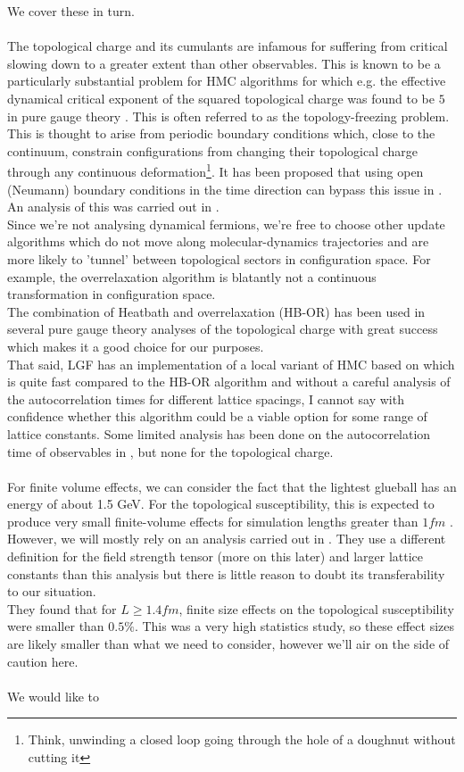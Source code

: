 \documentclass[a4paper,10pt]{book}
\begin{document}
We cover these in turn.\\\\The topological charge and its cumulants are infamous for suffering from critical slowing down to a greater extent than other observables. This is known to be a particularly substantial problem for HMC algorithms for which e.g. the effective dynamical critical exponent of the squared topological charge was found to be $5$ in pure gauge theory \cite{2011}. This is often referred to as the topology-freezing problem. This is thought to arise from periodic boundary conditions which, close to the continuum, constrain configurations from changing their topological charge through any continuous deformation\footnote{Think, unwinding a closed loop going through the hole of a doughnut without cutting it}. It has been proposed that using open (Neumann) boundary conditions in the time direction can bypass this issue in \cite{Lusch_top_bar}. An analysis of this was carried out in \cite{PhysRevD.90.074502}.\\Since we're not analysing dynamical fermions, we're free to choose other update algorithms which do not move along molecular-dynamics trajectories and are more likely to 'tunnel' between topological sectors in configuration space. For example, the overrelaxation algorithm is blatantly not a continuous transformation in configuration space.\\The combination of Heatbath and overrelaxation (HB-OR) has been used in several pure gauge theory analyses of the topological charge \cite{non_gaussianities2015} \cite{PhysRevD.92.094518} with great success which makes it a good choice for our purposes.\\That said, LGF has an implementation of a local variant of HMC based on \cite{Kennedy_1994} which is quite fast compared to the HB-OR algorithm and without a careful analysis of the autocorrelation times for different lattice spacings, I cannot say with confidence whether this algorithm could be a viable option for some range of lattice constants. Some limited analysis has been done on the autocorrelation time of observables in \cite{LHMC_autocorr}, but none for the topological charge.\\\\For finite volume effects, we can consider the fact that the lightest glueball has an energy of about 1.5 GeV. For the topological susceptibility, this is expected to produce very small finite-volume effects for simulation lengths greater than $1fm$ \cite{Del_Debbio_2005}. However, we will mostly rely on an analysis carried out in \cite{non_gaussianities2015}. They use a different definition for the field strength tensor (more on this later) and larger lattice constants than this analysis but there is little reason to doubt its transferability to our situation.\\They found that for $L\geq 1.4fm$, finite size effects on the topological susceptibility were smaller than  $0.5\%$. This was a very high statistics study, so these effect sizes are likely smaller than what we need to consider, however we'll air on the side of caution here.\\\\We would like to 
\end{document}
